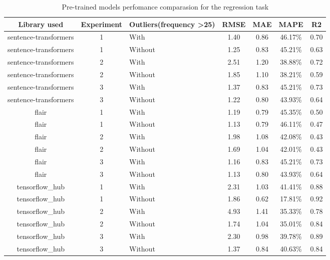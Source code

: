 \documentclass[12pt,MSc,a4paper,oneside]{muthesis}
\begin{document}
    \begin{table}[h]
      \caption{Pre-trained models perfomance comparasion for the regression task}
      \label{tab:pretrained-models}
      \begin{tabularx}{\textwidth}{|C|C|L|C|C|C|C|}
        \toprule
        {Library used}&{Experiment}&{Outliers(frequency \textgreater25)}&{RMSE}&{MAE}&{MAPE}&{R2}\\
        \midrule
        sentence-transformers & 1 & With & 1.40 & 0.86 & 46.17\% & 0.70\\
        sentence-transformers & 1 & Without & 1.25 & 0.83 & 45.21\% & 0.63\\
        sentence-transformers & 2 & With & 2.51 & 1.20 & 38.88\% & 0.72\\
        sentence-transformers & 2 & Without & 1.85 & 1.10 & 38.21\% & 0.59\\
        sentence-transformers & 3 & With & 1.37 & 0.83 & 45.21\% & 0.73\\
        sentence-transformers & 3 & Without & 1.22 & 0.80 & 43.93\% & 0.64\\
        flair & 1 & With & 1.19 & 0.79 & 45.35\% & 0.50\\
        flair & 1 & Without & 1.13 & 0.79 & 46.11\% & 0.47\\
        flair & 2 & With & 1.98 & 1.08 & 42.08\% & 0.43\\
        flair & 2 & Without & 1.69 & 1.04 & 42.01\% & 0.43\\
        flair & 3 & With & 1.16 & 0.83 & 45.21\% & 0.73\\
        flair & 3 & Without & 1.13 & 0.80 & 43.93\% & 0.64\\
        tensorflow\_hub & 1 & With & 2.31 & 1.03 & 41.41\% & 0.88\\
        tensorflow\_hub & 1 & Without & 1.86 & 0.62 & 17.81\% & 0.92\\
        tensorflow\_hub & 2 & With & 4.93 & 1.41 & 35.33\% & 0.78\\
        tensorflow\_hub & 2 & Without & 1.74 & 1.04 & 35.01\% & 0.84\\
        tensorflow\_hub & 3 & With & 2.30 & 0.98 & 39.78\% & 0.89\\
        tensorflow\_hub & 3 & Without & 1.37 & 0.84 & 40.63\% & 0.84\\
        \bottomrule
      \end{tabularx}
    \end{table}
\end{document}
